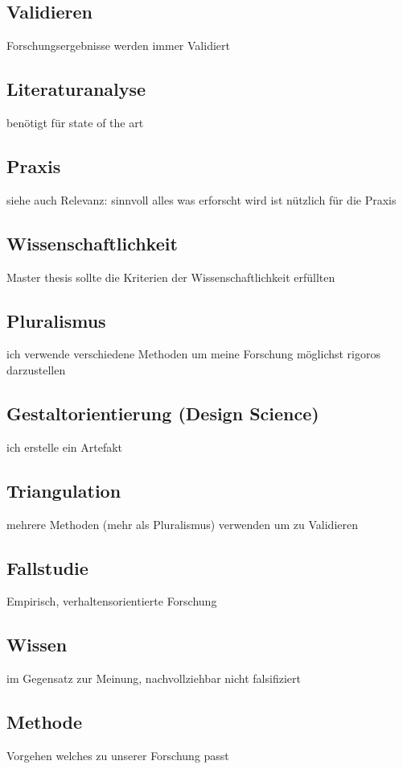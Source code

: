 \documentclass[DIV=calc, paper=a4, fontsize=11pt, twocolumn]{scrartcl}	 %
\begin{document}
\subsection*{Validieren}
Forschungsergebnisse werden immer Validiert

\subsection*{Literaturanalyse}
benötigt für state of the art

\subsection*{Praxis}
siehe auch Relevanz: sinnvoll alles was erforscht wird ist nützlich für die Praxis

\subsection*{Wissenschaftlichkeit}
Master thesis sollte die Kriterien der Wissenschaftlichkeit erfüllten

\subsection*{Pluralismus}
ich verwende verschiedene Methoden um meine Forschung möglichst rigoros darzustellen

\subsection*{Gestaltorientierung (Design Science)}
ich erstelle ein Artefakt

\subsection*{Triangulation}
mehrere Methoden (mehr als Pluralismus) verwenden um zu Validieren

\subsection*{Fallstudie}
Empirisch, verhaltensorientierte Forschung

\subsection*{Wissen}
im Gegensatz zur Meinung, nachvollziehbar nicht falsifiziert

\subsection*{Methode}
Vorgehen welches zu unserer Forschung passt
\end{document}
